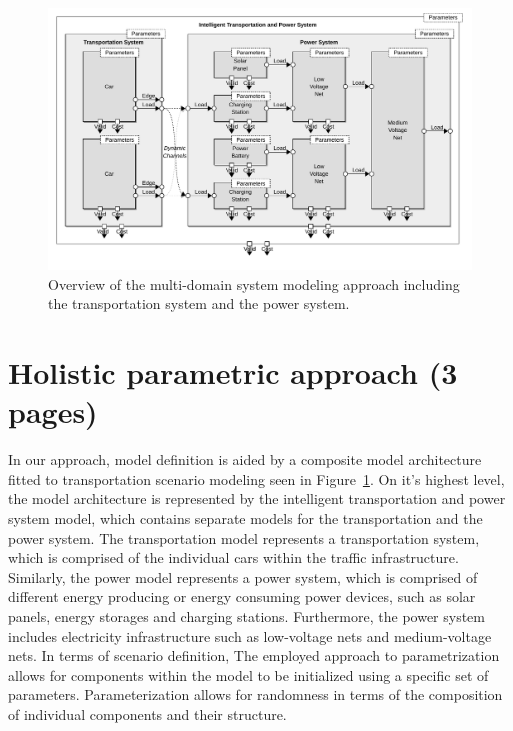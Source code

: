 \begin{figure}[h]
	\centering
	\includegraphics[width=\textwidth]{../gfx/model2.pdf}
	\caption{Overview of the multi-domain system modeling approach including the transportation system and the power system.}
	\label{fig:model}
\end{figure}

\section{Holistic parametric approach (3 pages)}
\label{section:contribution_1}

In our approach, model definition is aided by a composite model architecture fitted to transportation scenario modeling seen in Figure~\ref{fig:model}. On it's highest level, the model architecture is represented by the intelligent transportation and power system model, which contains separate models for the transportation and the power system. The transportation model represents a transportation system, which is comprised of the individual cars within the traffic infrastructure. Similarly, the power model represents a power system, which is comprised of different energy producing or energy consuming power devices, such as solar panels, energy storages and charging stations. Furthermore, the power system includes electricity infrastructure such as low-voltage nets and medium-voltage nets. In terms of scenario definition, The employed approach to parametrization allows for components within the model to be initialized using a specific set of parameters. Parameterization allows for randomness in terms of the composition of individual components and their structure. 

